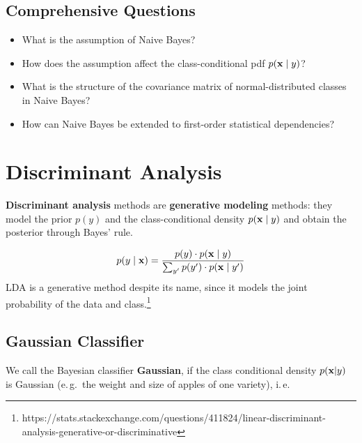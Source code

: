 \subsection{Comprehensive Questions}
 \begin{itemize}
    \item What is the assumption of Naive Bayes? 
    \item How does the assumption affect the class-conditional pdf $p(\bm{\mathrm{x}}\mid y)$? 
    \item What is the structure of the covariance matrix of normal-distributed classes in Naive Bayes? 
    \item How can Naive Bayes be extended to first-order statistical dependencies?
  \end{itemize}
  \newpage

\section{Discriminant Analysis}

 \textbf{Discriminant analysis} methods are \textbf{generative modeling} methods: they model the prior $p(y)$ and the class-conditional density $p(\bm{\mathrm{x}}\mid y)$ and obtain the posterior through Bayes' rule.\autocite{hastie2009,bishop2006}
  
  \begin{displaymath}
    p(y\mid\bm{\mathrm{x}}) = \frac{p(y)\cdot p(\bm{\mathrm{x}}\mid y)}{\sum_{y'} p(y')\cdot p(\bm{\mathrm{x}}\mid y')}
  \end{displaymath}
  LDA is a generative method despite its name, since it models the joint probability of the data and class.\footnote{https://stats.stackexchange.com/questions/411824/linear-discriminant-analysis-generative-or-discriminative}
  
  \subsection{Gaussian Classifier}
   We call the Bayesian classifier \textbf{Gaussian}, if the class conditional density $p(\bm{\mathrm{x}}|y)$ is Gaussian (e.\,g.\ the weight and size of apples of one variety), i.\,e.

